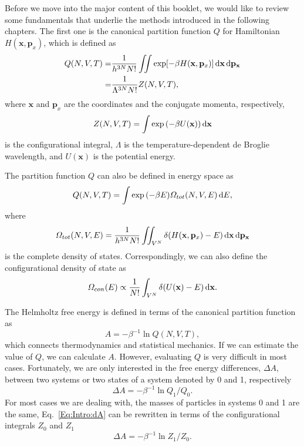 Before we move into the major content of this booklet, we would like to review some fundamentals that underlie the methods introduced in the following chapters. The first one is the canonical partition function $Q$ for Hamiltonian $H(\mathbf{x},\mathbf{p}_{x})$, which is defined as
\begin{align}
  Q(N,V,T)=&\frac{1}{{h}^{3N}N!} \iint \exp[-\beta H(\mathbf{x},\mathbf{p}_{x})] \mathop{}\!\mathrm{d}\mathbf{x}\mathop{}\!\mathrm{d}\mathbf{p}_\mathbf{x}\notag\\
         =&\frac{1}{\Lambda^{3N}N!}Z(N,V,T),
\end{align}
where $\mathbf{x}$ and $\mathbf{p}_{x}$ are the coordinates and the conjugate momenta, respectively,
\begin{equation}
	Z(N,V,T)=\int \exp{\left(-\beta U(\mathbf{x})\right)}\mathop{}\!\mathrm{d}\mathbf{x}
\end{equation}
is the configurational integral, $\Lambda$ is the temperature-dependent de Broglie wavelength, and $U(\mathbf{x})$ is the potential energy.

The partition function $Q$ can also be defined in energy space as
\begin{equation}
	Q(N,V,T)=\int \exp{\left(-\beta E\right)}\varOmega_{tot}(N,V,E)\mathop{}\!\mathrm{d} E,
\end{equation}
where
\begin{equation}
	\varOmega_{tot}(N,V,E)=\frac{1}{{h}^{3N}N!}\iint_{V^N} \delta(H(\mathbf{x},\mathbf{p}_{x})-E)\mathop{}\!\mathrm{d}\mathbf{x}\mathop{}\!\mathrm{d}\mathbf{p}_\mathbf{x}
\end{equation}
is the complete density of states. Correspondingly, we can also define the configurational density of state as
\begin{equation}
	\varOmega_{con}(E)\propto\frac{1}{N!}\int_{V^N} \delta(U(\mathbf{x})-E)\mathop{}\!\mathrm{d}\mathbf{x}.
\end{equation}

The Helmholtz free energy is defined in terms of the canonical partition function as
\begin{equation}
A=-\beta^{-1}\ln{Q(N,V,T)},
\end{equation}
which connects thermodynamics and statistical mechanics. If we can estimate the value of $Q$, we can calculate $A$. However, evaluating $Q$ is very difficult in most cases. Fortunately, we are only interested in the free energy differences, $\Delta A$, between two systems or two states of a system denoted by 0 and 1, respectively
\begin{equation}
\Delta A=-\beta^{-1}\ln{Q_1/Q_0}.
\label{Eq:Intro:dA}
\end{equation}
For most cases we are dealing with, the masses of particles in systems 0 and 1 are the same, Eq.~\ref{Eq:Intro:dA} can be rewritten in terms of the configurational integrals $Z_0$ and $Z_1$
\begin{equation}
\Delta A=-\beta^{-1}\ln{Z_1/Z_0}.
\end{equation}

